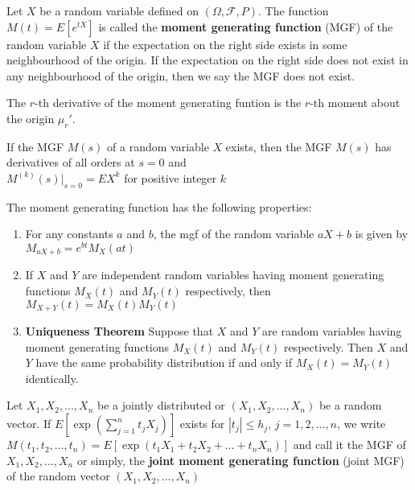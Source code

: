 \begin{defn}
    Let $X$ be a random variable defined on $\left (\Omega,  \mathcal{F}, P\right )$. The function $M\left (t\right ) = E\left [e ^{t X}\right ]$ is called the \textbf{moment generating function} (MGF) of the random variable $X$ if the expectation on the right side exists in some neighbourhood of the origin. If the expectation on the right side does not exist in any neighbourhood of the origin, then we say the MGF does not exist.
\end{defn}

\begin{samepage}
The $r$-th derivative of the moment generating funtion is the $r$-th moment about the origin $\mu_r '$.
\begin{thm}
    If the MGF $M(s)$ of a random variable $X$ exists, then the MGF $M(s)$ has derivatives of all orders at $s=0$ and \\

    $M^{(k)} (s) |_{s=0} = EX^k$ for positive integer $k$
\end{thm}

\end{samepage}
\begin{thm}
    The moment generating function has the following properties:
    \begin{enumerate}
        \item For any constants $a$ and $b$, the mgf of the random variable $a X + b$ is given by $M_{aX+b} = e^{bt} M_X(at)$
        \item If $X$ and $Y$ are independent random variables having moment generating functions $M_X(t)$ and $M_Y(t)$ respectively, then $M_{X+Y}(t) = M_X(t) M_Y(t)$
        \item \textbf{Uniqueness Theorem} Suppose that $X$ and $Y$ are random variables having moment generating functions $M_X(t)$ and $M_Y(t)$ respectively. Then $X$ and $Y$ have the same probability distribution if and only if $M_X(t) = M_Y(t)$ identically.
    \end{enumerate}
\end{thm}

\begin{defn}
    Let $X_1, X_2, ..., X_n$ be a jointly distributed or $(X_1, X_2, ..., X_n)$ be a random vector. If $E[\exp ( \sum_{j=1}^n t_j X_j )]$ exists for $|t_j| \leq h_j$, $j = 1, 2, ...,n$, we write $M(t_1, t_2, ..., t_n) = E[\exp(t_1 X_1 + t_2 X_2 + ... + t_n X_n)]$ and call it the MGF of $X_1, X_2, ..., X_n$ or simply, the \textbf{joint moment generating function} (joint MGF) of the random vector $(X_1, X_2, ..., X_n)$
\end{defn}

